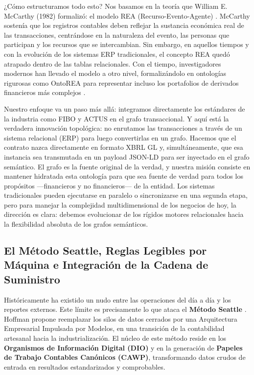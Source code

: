 \documentclass[12pt, a4paper]{article}
\begin{document}
¿Cómo estructuramos todo esto? Nos basamos en la teoría que William E. McCarthy (1982) formalizó: el modelo REA (Recurso-Evento-Agente) \cite{mccarthy1982}. McCarthy sostenía que los registros contables deben reflejar la sustancia económica real de las transacciones, centrándose en la naturaleza del evento, las personas que participan y los recursos que se intercambian. Sin embargo, en aquellos tiempos y con la evolución de los sistemas ERP tradicionales, el concepto REA quedó atrapado dentro de las tablas relacionales. Con el tiempo, investigadores modernos han llevado el modelo a otro nivel, formalizándolo en ontologías rigurosas como OntoREA \cite{fischerpauzenberger2017} para representar incluso los portafolios de derivados financieros más complejos \cite{fischerpauzenberger2018}.

Nuestro enfoque va un paso más allá: integramos directamente los estándares de la industria como FIBO \cite{edmc2020} y ACTUS \cite{actus2018} en el grafo transaccional. Y aquí está la verdadera innovación topológica: no enrutamos las transacciones a través de un sistema relacional (ERP) para luego convertirlas en un grafo. Hacemos que el contrato nazca directamente en formato XBRL GL y, simultáneamente, que esa instancia sea transmutada en un payload JSON-LD para ser inyectado en el grafo semántico. El grafo es la fuente original de la verdad, y nuestra misión consiste en mantener hidratada esta ontología para que sea fuente de verdad para todos los propósitos ---financieros y no financieros--- de la entidad. Los sistemas tradicionales pueden ejecutarse en paralelo o sincronizarse en una segunda etapa, pero para manejar la complejidad multidimensional de los negocios de hoy, la dirección es clara: debemos evolucionar de los rígidos motores relacionales hacia la flexibilidad absoluta de los grafos semánticos.

\subsection{El Método Seattle, Reglas Legibles por Máquina e Integración de la Cadena de Suministro}
Históricamente ha existido un nudo entre las operaciones del día a día y los reportes externos. Este límite es precisamente lo que ataca el \textbf{Método Seattle} \cite{hoffman2025}. Hoffman propone reemplazar los silos de datos cerrados por una Arquitectura Empresarial Impulsada por Modelos, en una transición de la contabilidad artesanal hacia la industrialización. El núcleo de este método reside en los \textbf{Organismos de Información Digital (DIO)} y en la generación de \textbf{Papeles de Trabajo Contables Canónicos (CAWP)}, transformando datos crudos de entrada en resultados estandarizados y comprobables.
\end{document}
